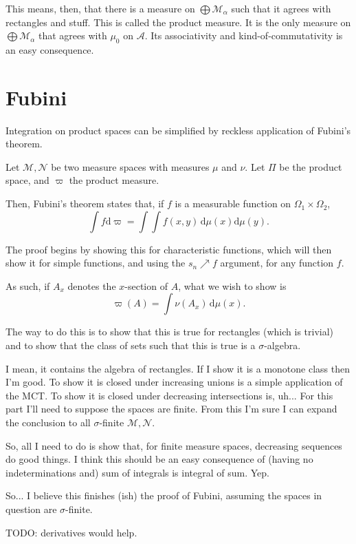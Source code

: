 \documentclass{article}
\theoremstyle{definition}
\newcommand{\M}{\mathcal{M}}
\newcommand{\CN}{\mathcal{N}}
\newcommand{\A}{\mathcal{A}}
\newcommand{\dd}{\mathrm{d}}
\begin{document}
	This means, then, that there is a measure on $\bigoplus \M_\alpha$ such that it agrees with rectangles and stuff. This is called the product measure. It is the only measure on $\bigoplus \M_\alpha$ that agrees with $\mu_0$ on $\A$. Its associativity and kind-of-commutativity is an easy consequence.
	
	\section{Fubini}
	
	Integration on product spaces can be simplified by reckless application of Fubini's theorem.
	
	Let $\M, \CN$ be two measure spaces with measures $\mu$ and $\nu$. Let $\Pi$ be the product space, and $\varpi$ the product measure.
	
	Then, Fubini's theorem states that, if $f$ is a measurable function on $\Omega_1 \times \Omega_2$,
	\[ \int f \dd \varpi = \int \int f(x, y) \, \dd \mu(x) \dd \mu(y) .\]
	
	The proof begins by showing this for characteristic functions, which will then show it for simple functions, and using the $s_n \nearrow f$ argument, for any function $f$.
	
	As such, if $A_x$ denotes the $x$-section of $A$, what we wish to show is
	\[ \varpi(A) = \int \nu(A_x) \,\dd \mu(x) .\]
	
	The way to do this is to show that this is true for rectangles (which is trivial) and to show that the class of sets such that this is true is a $\sigma$-algebra.
	
	I mean, it contains the algebra of rectangles. If I show it is a monotone class then I'm good. To show it is closed under increasing unions is a simple application of the MCT. To show it is closed under decreasing intersections is, uh... For this part I'll need to suppose the spaces are finite. From this I'm sure I can expand the conclusion to all $\sigma$-finite $\M, \CN$.
	
	So, all I need to do is show that, for finite measure spaces, decreasing sequences do good things. I think this should be an easy consequence of (having no indeterminations and) sum of integrals is integral of sum. Yep.
	
	So... I believe this finishes (ish) the proof of Fubini, assuming the spaces in question are $\sigma$-finite.
	
	TODO: derivatives would help.
	
\end{document}
